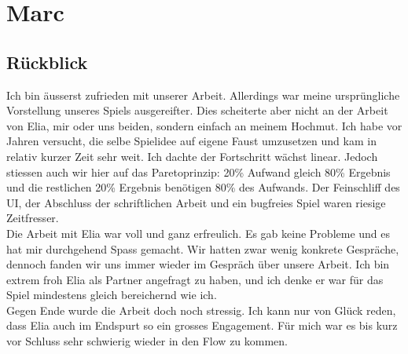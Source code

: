 \chapter{Marc}

\section{Rückblick}
Ich bin äusserst zufrieden mit unserer Arbeit.
Allerdings war meine ursprüngliche Vorstellung unseres Spiels ausgereifter.
Dies scheiterte aber nicht an der Arbeit von Elia, mir oder uns beiden, sondern einfach an meinem Hochmut.
Ich habe vor Jahren versucht, die selbe Spielidee auf eigene Faust umzusetzen und kam in relativ kurzer Zeit sehr weit.
Ich dachte der Fortschritt wächst linear.
Jedoch stiessen auch wir hier auf das Paretoprinzip: 20\% Aufwand gleich 80\% Ergebnis und die restlichen 20\% Ergebnis benötigen 80\% des Aufwands.
Der Feinschliff des UI, der Abschluss der schriftlichen Arbeit und ein bugfreies Spiel waren riesige Zeitfresser. \\
Die Arbeit mit Elia war voll und ganz erfreulich.
Es gab keine Probleme und es hat mir durchgehend Spass gemacht.
Wir hatten zwar wenig konkrete Gespräche, dennoch fanden wir uns immer wieder im Gespräch über unsere Arbeit.
Ich bin extrem froh Elia als Partner angefragt zu haben, und ich denke er war für das Spiel mindestens gleich bereichernd wie ich. \\
Gegen Ende wurde die Arbeit doch noch stressig.
Ich kann nur von Glück reden, dass Elia auch im Endspurt so ein grosses Engagement.
Für mich war es bis kurz vor Schluss sehr schwierig wieder in den Flow zu kommen.

